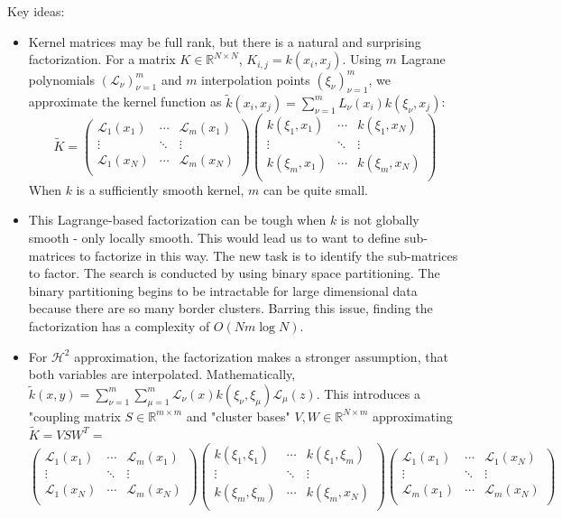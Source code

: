 \documentclass[11pt, oneside]{article}   	%
\begin{document}
Key ideas:
\begin{itemize}
\item Kernel matrices may be full rank, but there is a natural and surprising factorization. For a matrix $K \in \mathbb{R}^{N\times N}$, $K_{i,j} = k(x_i,x_j)$. Using $m$ Lagrane polynomials $(\mathcal{L}_\nu)_{\nu=1}^m$ and $m$ interpolation points $(\xi_\nu)_{\nu=1}^m$, we approximate the kernel function as $\tilde k(x_i,x_j) = \sum_{\nu=1}^m L_\nu(x_i)k(\xi_\nu,x_j)$:
$$\tilde K = \begin{pmatrix} \mathcal{L}_1(x_1) & \cdots & \mathcal{L}_m(x_1)\\ \vdots & \ddots & \vdots\\ \mathcal{L}_1(x_N) & \cdots & \mathcal{L}_m(x_N)\\ \end{pmatrix}\begin{pmatrix} k(\xi_1,x_1) & \cdots & k(\xi_1, x_N) \\	 \vdots & \ddots & \vdots \\ 	 k(\xi_m,x_1) & \cdots & k(\xi_m,x_N) \\ \end{pmatrix}$$
When $k$ is a sufficiently smooth kernel, $m$ can be quite small.
\item This Lagrange-based factorization can be tough when $k$ is not globally smooth - only locally smooth. This would lead us to want to define sub-matrices to factorize in this way. The new task is to identify the sub-matrices to factor. The search is conducted by using binary space partitioning. The binary partitioning begins to be intractable for large dimensional data because there are so many border clusters. Barring this issue, finding the factorization has a complexity of $O(Nm\log N)$.
\item For $\mathcal{H}^2$ approximation, the factorization makes a stronger assumption, that both variables are interpolated. Mathematically, $\tilde k(x,y) = \sum_{\nu=1}^m \sum_{\mu=1}^m \mathcal{L}_\nu(x) k(\xi_\nu,\xi_\mu) \mathcal{L}_\mu(z)$. This introduces a "coupling matrix $S \in \mathbb{R}^{m\times m}$ and "cluster bases" $V,W \in \mathbb{R}^{N\times m}$ approximating $\tilde{K} = VSW^T =$
$$\begin{pmatrix} \mathcal{L}_1(x_1) & \cdots & \mathcal{L}_m(x_1)\\ \vdots & \ddots & \vdots\\ \mathcal{L}_1(x_N) & \cdots & \mathcal{L}_m(x_N)\\ \end{pmatrix}\begin{pmatrix} k(\xi_1,\xi_1) & \cdots & k(\xi_1, \xi_m) \\	 \vdots & \ddots & \vdots \\ 	 k(\xi_m,\xi_m) & \cdots & k(\xi_m,x_N) \\ \end{pmatrix} \begin{pmatrix} \mathcal{L}_1(x_1) & \cdots & \mathcal{L}_1(x_N)\\ \vdots & \ddots & \vdots\\ \mathcal{L}_m(x_1) & \cdots & \mathcal{L}_m(x_N)\\ \end{pmatrix}$$

\end{itemize}
\end{document}

